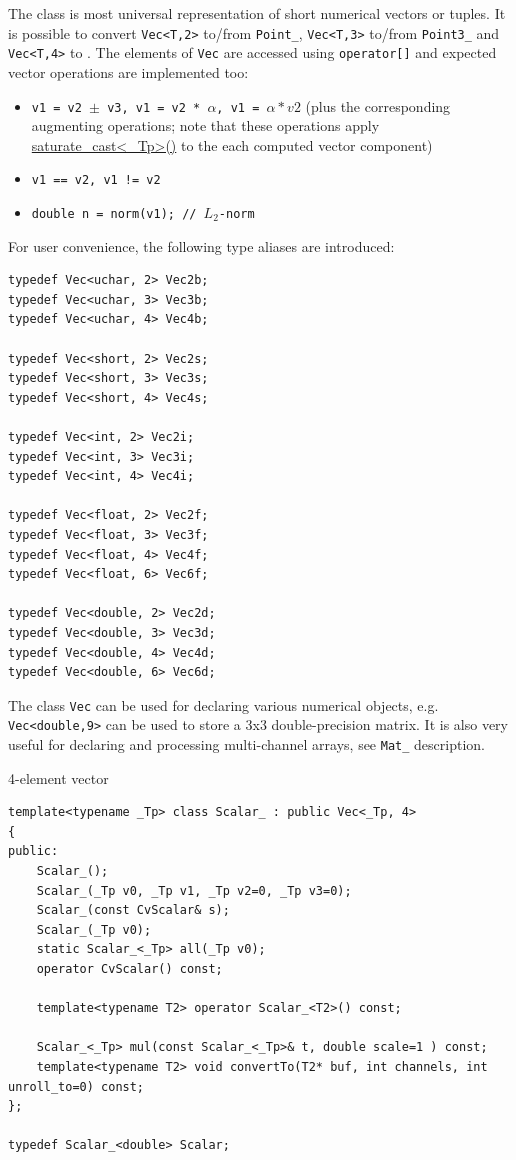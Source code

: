 The class is most universal representation of short numerical vectors or tuples. It is possible to convert \texttt{Vec<T,2>} to/from \texttt{Point\_}, \texttt{Vec<T,3>} to/from \texttt{Point3\_} and \texttt{Vec<T,4>} to . The elements of \texttt{Vec} are accessed using \texttt{operator[]} and expected vector operations are implemented too:

\begin{itemize}
    \item \texttt{v1 = v2 $\pm$ v3, v1 = v2 * $\alpha$, v1 = $\alpha * v2$} (plus the corresponding augmenting operations; note that these operations apply \href{saturate}{saturate\_cast<\_Tp>()} to the each computed vector component)
    \item \texttt{v1 == v2, v1 != v2}
    \item \texttt{double n = norm(v1); // $L_2$-norm}
\end{itemize}

For user convenience, the following type aliases are introduced:
\begin{lstlisting}
typedef Vec<uchar, 2> Vec2b;
typedef Vec<uchar, 3> Vec3b;
typedef Vec<uchar, 4> Vec4b;

typedef Vec<short, 2> Vec2s;
typedef Vec<short, 3> Vec3s;
typedef Vec<short, 4> Vec4s;

typedef Vec<int, 2> Vec2i;
typedef Vec<int, 3> Vec3i;
typedef Vec<int, 4> Vec4i;

typedef Vec<float, 2> Vec2f;
typedef Vec<float, 3> Vec3f;
typedef Vec<float, 4> Vec4f;
typedef Vec<float, 6> Vec6f;

typedef Vec<double, 2> Vec2d;
typedef Vec<double, 3> Vec3d;
typedef Vec<double, 4> Vec4d;
typedef Vec<double, 6> Vec6d;
\end{lstlisting}

The class \texttt{Vec} can be used for declaring various numerical objects, e.g. \texttt{Vec<double,9>} can be used to store a 3x3 double-precision matrix. It is also very useful for declaring and processing multi-channel arrays, see \texttt{Mat\_} description.

4-element vector

\begin{lstlisting}
template<typename _Tp> class Scalar_ : public Vec<_Tp, 4>
{
public:
    Scalar_();
    Scalar_(_Tp v0, _Tp v1, _Tp v2=0, _Tp v3=0);
    Scalar_(const CvScalar& s);
    Scalar_(_Tp v0);
    static Scalar_<_Tp> all(_Tp v0);
    operator CvScalar() const;

    template<typename T2> operator Scalar_<T2>() const;

    Scalar_<_Tp> mul(const Scalar_<_Tp>& t, double scale=1 ) const;
    template<typename T2> void convertTo(T2* buf, int channels, int unroll_to=0) const;
};

typedef Scalar_<double> Scalar;
\end{lstlisting}


